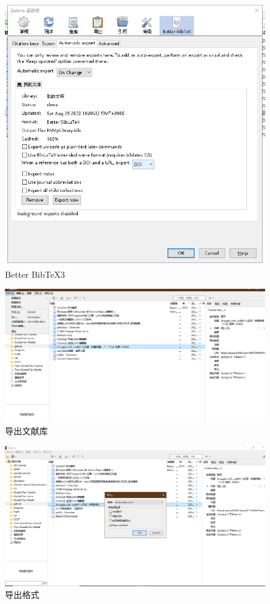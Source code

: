 \begin{figure}
	\centering
	\includegraphics[scale=0.8]{Fig/zotero11.png}
	\caption{\label{op11}Better BibTeX3}
\end{figure}

\begin{figure}[htbp]
	\centering
	\includegraphics[scale=0.42]{Fig/zotero12.png}
	\caption{\label{output}导出文献库}
\end{figure}

\begin{figure}[htbp]
	\centering
	\includegraphics[scale=0.42]{Fig/zotero13.png}
	\caption{\label{output_format}导出格式}
\end{figure}

